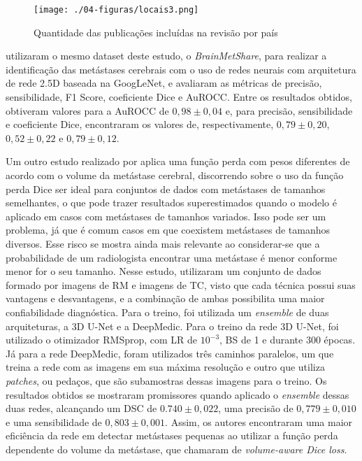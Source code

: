 \begin{figure}[!htb]
\centering
    \texttt{[image: ./04-figuras/locais3.png]}
	\caption{Quantidade das publicações incluídas na revisão por país}\vspace{-0.2cm}
    \label{fig:locais}
\end{figure}

\cite{Grovik:2020} utilizaram o mesmo dataset deste estudo, o \textit{BrainMetShare}, para realizar a identificação das metástases cerebrais com o uso de redes neurais com arquitetura de rede 2.5D baseada na GoogLeNet, e avaliaram as métricas de precisão, sensibilidade, F1 Score, coeficiente Dice e AuROCC. Entre os resultados obtidos, obtiveram valores para a AuROCC de $0,98 \pm 0,04$ e, para precisão, sensibilidade e coeficiente Dice, encontraram os valores de, respectivamente, $0,79 \pm 0,20$, $0,52 \pm 0,22$ e $0,79 \pm 0,12$.

Um outro estudo realizado por \cite{Hu:2019} aplica uma função perda com pesos diferentes de acordo com o volume da metástase cerebral, discorrendo sobre o uso da função perda Dice ser ideal para conjuntos de dados com metástases de tamanhos semelhantes, o que pode trazer resultados superestimados quando o modelo é aplicado em casos com metástases de tamanhos variados. Isso pode ser um problema, já que é comum casos em que coexistem metástases de tamanhos diversos. Esse risco se mostra ainda mais relevante ao considerar-se que a probabilidade de um radiologista encontrar uma metástase é menor conforme menor for o seu tamanho. Nesse estudo, \cite{Hu:2019} utilizaram um conjunto de dados formado por imagens de RM e imagens de TC, visto que cada técnica possui suas vantagens e desvantagens, e a combinação de ambas possibilita uma maior confiabilidade diagnóstica. Para o treino, foi utilizada um \textit{ensemble} de duas arquiteturas, a 3D U-Net e a DeepMedic. Para o treino da rede 3D U-Net, foi utilizado o otimizador {\ttfamily RMSprop}, com LR de $10^{-3}$, BS de 1 e durante 300 épocas. Já para a rede DeepMedic, foram utilizados três caminhos paralelos, um que treina a rede com as imagens em sua máxima resolução e outro que utiliza \textit{patches}, ou pedaços, que são subamostras dessas imagens para o treino. Os resultados obtidos se mostraram promissores quando aplicado o \textit{ensemble} dessas duas redes, alcançando um DSC de $0.740 \pm 0,022$, uma precisão de $0,779 \pm 0,010$ e uma sensibilidade de $0,803 \pm 0,001$. Assim, os autores encontraram uma maior eficiência da rede em detectar metástases pequenas ao utilizar a função perda dependente do volume da metástase, que chamaram de \textit{volume-aware Dice loss}.


